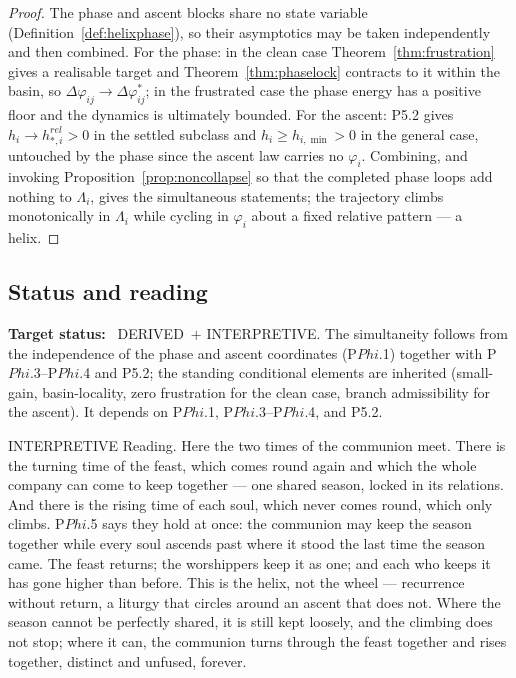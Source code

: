 \documentclass[11pt,a4paper]{article}
\def\Phi{Phi}%
\def\mathrm#1{#1}%
\def\emph#1{#1}%
\newcommand{\stDerived}{\textcolor{cDer}{\textsf{\small DERIVED}}}
\newcommand{\stInterp}{\textcolor{cInt}{\textsf{\small INTERPRETIVE}}}
\theoremstyle{definition}
\theoremstyle{plain}
\theoremstyle{remark}
\begin{document}
\begin{proof}
The phase and ascent blocks share no state variable
(Definition~\ref{def:helixphase}), so their asymptotics may be taken independently and then
combined. For the phase: in the clean case Theorem~\ref{thm:frustration} gives a realisable
target and Theorem~\ref{thm:phaselock} contracts to it within the basin, so
\(\Delta\varphi_{ij}\to\Delta\varphi_{ij}^{*}\); in the frustrated case the phase energy has a
positive floor and the dynamics is ultimately bounded. For the ascent: P5.2 gives
\(h_i\to h_{*,i}^{\mathrm{rel}}>0\) in the settled subclass and \(h_i\ge h_{i,\min}>0\) in the
general case, untouched by the phase since the ascent law carries no \(\varphi_i\). Combining,
and invoking Proposition~\ref{prop:noncollapse} so that the completed phase loops add nothing
to \(\Lambda_i\), gives the simultaneous statements; the trajectory climbs monotonically in
\(\Lambda_i\) while cycling in \(\varphi_i\) about a fixed relative pattern --- a helix.
\qedhere
\end{proof}

\subsection{Status and reading}

\textbf{Target status:}~
\stDerived\ \(+\) \stInterp. The simultaneity follows from the independence of the phase and
ascent coordinates (P$\Phi$.1) together with P$\Phi$.3--P$\Phi$.4 and P5.2; the standing
conditional elements are inherited (small-gain, basin-locality, zero frustration for the clean
case, branch admissibility for the ascent). It depends on P$\Phi$.1, P$\Phi$.3--P$\Phi$.4, and
P5.2.

\medskip
\stInterp\quad
\emph{Reading.}
Here the two times of the communion meet. There is the turning time of the feast, which comes
round again and which the whole company can come to keep together --- one shared season, locked
in its relations. And there is the rising time of each soul, which never comes round, which
only climbs. P$\Phi$.5 says they hold at once: the communion may keep the season together while
every soul ascends past where it stood the last time the season came. The feast returns; the
worshippers keep it as one; and each who keeps it has gone higher than before. This is the
helix, not the wheel --- recurrence without return, a liturgy that circles around an ascent
that does not. Where the season cannot be perfectly shared, it is still kept loosely, and the
climbing does not stop; where it can, the communion turns through the feast together and rises
together, distinct and unfused, forever.
\end{document}

